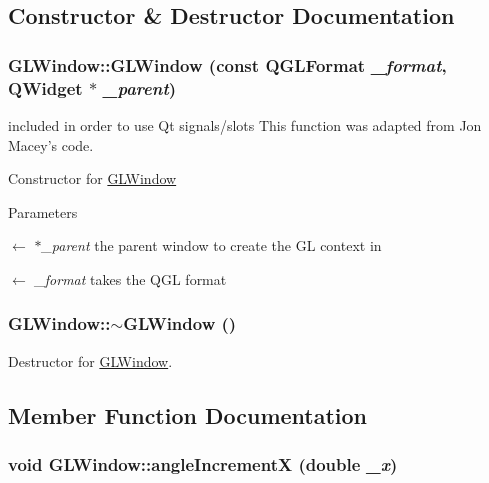 \subsection{Constructor \& Destructor Documentation}
\hypertarget{classGLWindow_a54ae7036a8f059e9ea6a3b91064837c8}{
\subsubsection[{GLWindow}]{\setlength{\rightskip}{0pt plus 5cm}GLWindow::GLWindow (const QGLFormat {\em \_\-format}, \/  QWidget $\ast$ {\em \_\-parent})}}
\label{classGLWindow_a54ae7036a8f059e9ea6a3b91064837c8}


included in order to use Qt signals/slots This function was adapted from Jon Macey's code.

Constructor for \hyperlink{classGLWindow}{GLWindow} 
\begin{DoxyParams}{Parameters}
\item[\mbox{$\leftarrow$} {\em $\ast$\_\-parent}]the parent window to create the GL context in \item[\mbox{$\leftarrow$} {\em \_\-format}]takes the QGL format \end{DoxyParams}
\hypertarget{classGLWindow_a2eeaea2148f4f72344edd6d1bac9759b}{
\subsubsection[{$\sim$GLWindow}]{\setlength{\rightskip}{0pt plus 5cm}GLWindow::$\sim$GLWindow ()}}
\label{classGLWindow_a2eeaea2148f4f72344edd6d1bac9759b}


Destructor for \hyperlink{classGLWindow}{GLWindow}. 

\subsection{Member Function Documentation}
\hypertarget{classGLWindow_a2e8c81886b99733cd341b64dc324ebf1}{
\subsubsection[{angleIncrementX}]{\setlength{\rightskip}{0pt plus 5cm}void GLWindow::angleIncrementX (double {\em \_\-x})}}
\label{classGLWindow_a2e8c81886b99733cd341b64dc324ebf1}


